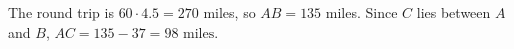 The round trip is $60\cdot4.5=270$ miles, so $AB=135$ miles. Since $C$ lies between $A$ and $B$, $AC=135-37=\boxed{98\text{ miles}}$.
